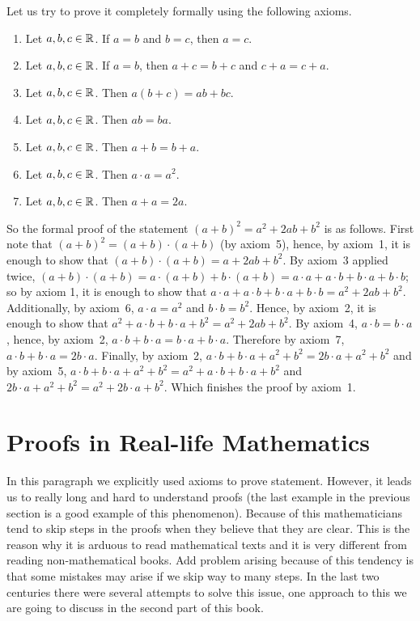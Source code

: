 Let us try to prove it completely formally using the following axioms.
\begin{enumerate}
  \item Let $a, b, c \in \mathbb{R}$. If $a = b$ and $b = c$, then $a = c$.
  \item Let $a, b, c \in \mathbb{R}$. If $a = b$, then $a + c = b + c$ and
    $c + a = c + a$.
  \item Let $a, b, c \in \mathbb{R}$. Then $a (b + c) = ab + bc$.
  \item Let $a, b, c \in \mathbb{R}$. Then $ab = ba$.
  \item Let $a, b, c \in \mathbb{R}$. Then $a + b = b + a$.
  \item Let $a, b, c \in \mathbb{R}$. Then $a \cdot a = a^2$.
  \item Let $a, b, c \in \mathbb{R}$. Then $a + a = 2a$.
\end{enumerate}
So the formal proof of the statement $(a + b)^2 = a^2 + 2ab + b^2$ is as
follows. First note that $(a + b)^2 = (a + b) \cdot (a + b)$ (by axiom~5),
hence, by axiom~1, it is enough to show that
$(a + b) \cdot (a + b) = a + 2ab + b^2$. By axiom~3 applied twice,
$(a + b) \cdot (a + b) = a \cdot (a + b) + b \cdot (a + b) =
a \cdot a + a \cdot b + b \cdot a + b \cdot b$; so by axiom 1, it is enough
to show that $a \cdot a + a \cdot b + b \cdot a + b \cdot b = a^2 + 2ab + b^2$.
Additionally, by axiom~6, $a \cdot a = a^2$ and $b \cdot b = b^2$. Hence, by
axiom~2, it is enough to show that
$a^2 + a \cdot b + b \cdot a + b^2 = a^2 + 2ab + b^2$. By axiom~4,
$a \cdot b = b \cdot a$, hence, by axiom~2,
$a \cdot b + b \cdot a = b \cdot a + b \cdot a$. Therefore by axiom~7,
$a \cdot b + b \cdot a = 2 b \cdot a$. Finally, by axiom~2,
$a \cdot b + b \cdot a + a^2 + b^2 = 2b \cdot a + a^2 + b^2$ and by axiom~5,
$a \cdot b + b \cdot a + a^2 + b^2 = a^2 + a \cdot b + b \cdot a + b^2$ and
$2b \cdot a + a^2 + b^2 =  a^2 + 2b \cdot a + b^2$. Which finishes the proof by
axiom~1.

\section{Proofs in Real-life Mathematics}
In this paragraph we explicitly used axioms to prove statement. However, it
leads us to really long and hard to understand proofs (the last example in the
previous section is a good example of this phenomenon). Because of this
mathematicians tend to skip steps in the proofs when they believe that they are
clear. This is the reason why it is arduous to read mathematical texts and it
is very different from reading non-mathematical books. Add problem arising
because of this tendency is that some mistakes may arise if we skip way to many
steps. In the last two centuries there were several attempts to solve this
issue, one approach to this we are going to discuss in the second part of this
book.

